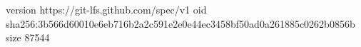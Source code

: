version https://git-lfs.github.com/spec/v1
oid sha256:3b566d60010e6eb716b2a2c591e2e0e44ec3458bf50ad0a261885c0262b0856b
size 87544
